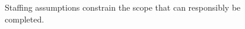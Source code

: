 \begin{figure}[H]
\centering
{}
\caption{Staffing assumptions constrain the scope that can responsibly be completed.}\label{fig:teach-P-04-prototype-01}
\end{figure}
